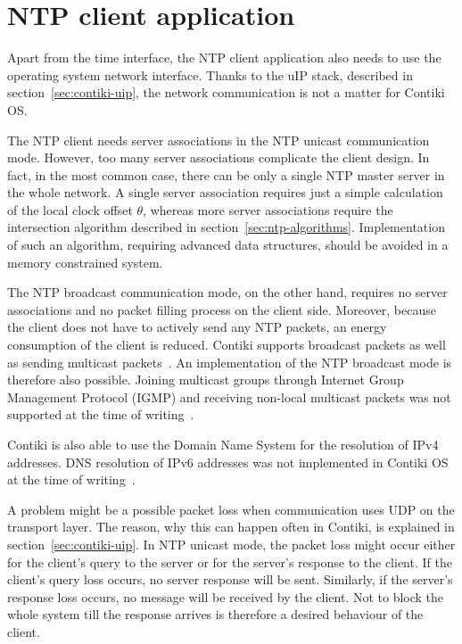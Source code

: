 
\section{NTP client application}\label{sec:analysis-application}
Apart from the time interface, the NTP client application
also needs to use the operating system network interface.
Thanks to the uIP stack, described in section~\ref{sec:contiki-uip},
the network communication is not a matter for Contiki OS.

The NTP client needs server associations in the NTP unicast communication mode.
However, too many server associations complicate the client design.
In fact, in the most common case, there can be only a single NTP master server
in the whole network.
A single server association requires just a simple calculation of the local clock offset
$\theta$, whereas more server associations require the intersection algorithm
described in section~\ref{sec:ntp-algorithms}.
Implementation of such an algorithm, requiring advanced data structures, should be avoided
in a memory constrained system.

The NTP broadcast communication mode, on the other hand,
requires no server associations and no packet filling process on the client side.
Moreover, because the client does not have to actively send any NTP packets,
an energy consumption of the client is reduced.
Contiki supports broadcast packets as well as sending multicast packets~\cite{contiki-docs}.
An implementation of the NTP broadcast mode is therefore also possible.
Joining multicast groups through Internet Group Management Protocol (IGMP)
and receiving non-local multicast packets
was not supported at the time of writing~\cite{contiki-docs}.

Contiki is also able to use the Domain Name System for the resolution of IPv4 addresses.
DNS resolution of IPv6 addresses was not implemented in Contiki OS
at the time of writing~\cite{contiki-docs}.

A problem might be a possible packet loss when communication uses UDP on the transport layer.
The reason, why this can happen often in Contiki, is explained in section~\ref{sec:contiki-uip}.
In NTP unicast mode, the packet loss might occur either for the client's query to the server
or for the server's response to the client.
If the client's query loss occurs, no server response will be sent.
Similarly, if the server's response loss occurs, no message will be received by the client.
Not to block the whole system till the response arrives
is therefore a desired behaviour of the client.

